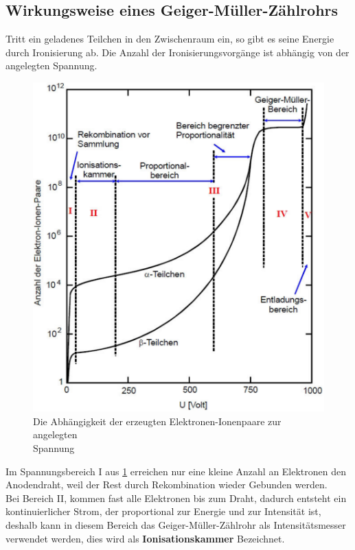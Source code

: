 \subsection{Wirkungsweise eines Geiger-Müller-Zählrohrs}
Tritt ein geladenes Teilchen in den Zwischenraum ein, so gibt es seine Energie durch Ironisierung ab. Die Anzahl der Ironisierungsvorgänge ist abhängig von der angelegten Spannung.\\
\begin{figure}[h!]
\centering
\includegraphics[scale=0.5]{Grafiken/Theorie1.pdf}
\caption{Die Abhängigkeit der erzeugten Elektronen-Ionenpaare zur angelegten\\ Spannung \cite{V703} \label{Th2}}
\end{figure}
Im Spannungsbereich I aus \cref{Th2} erreichen nur eine kleine Anzahl an Elektronen den Anodendraht, weil der Rest durch Rekombination wieder Gebunden werden. \\
Bei Bereich II, kommen fast alle Elektronen bis zum Draht, dadurch entsteht ein kontinuierlicher Strom, der proportional zur Energie und zur Intensität ist, deshalb kann in diesem Bereich das Geiger-Müller-Zählrohr als Intensitätsmesser verwendet werden, dies wird als \textbf{Ionisationskammer} Bezeichnet.\newpage
